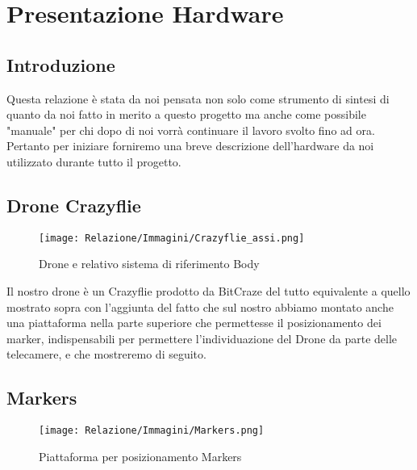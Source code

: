 \chapter*{Presentazione Hardware}
\section*{Introduzione}

Questa relazione è stata da noi pensata non solo come strumento di sintesi di quanto da noi fatto in merito a questo progetto ma anche come possibile "manuale" per chi dopo di noi vorrà continuare il lavoro svolto fino ad ora. Pertanto per iniziare forniremo una breve descrizione dell’hardware da noi utilizzato durante tutto il progetto. 

\section*{Drone Crazyflie}

\begin{figure}[h]
    \centering
    \texttt{[image: Relazione/Immagini/Crazyflie\_assi.png]}	
    \caption{Drone e relativo sistema di riferimento Body}
    \label{fig:Crazyflie_assi}
\end{figure}

Il nostro drone è un Crazyflie prodotto da BitCraze del tutto equivalente a quello mostrato sopra con l'aggiunta del fatto che sul nostro abbiamo montato anche una piattaforma nella parte superiore che permettesse il posizionamento dei marker, indispensabili per permettere l’individuazione del Drone da parte delle telecamere, e che mostreremo di seguito. 

\section*{Markers}

\begin{figure}[h]
    \centering
    \texttt{[image: Relazione/Immagini/Markers.png]}	
    \caption{Piattaforma per posizionamento Markers}
    \label{fig:Markers}
\end{figure}

